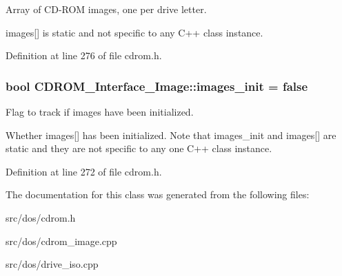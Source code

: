 Array of C\-D-\/\-R\-O\-M images, one per drive letter. 

images\mbox{[}\mbox{]} is static and not specific to any C++ class instance. 

Definition at line 276 of file cdrom.\-h.

\hypertarget{classCDROM__Interface__Image_a901be8d60520cf91bcabeb67a808c644}{
\subsubsection[{images\-\_\-init}]{\setlength{\rightskip}{0pt plus 5cm}bool {\bf C\-D\-R\-O\-M\-\_\-\-Interface\-\_\-\-Image\-::images\-\_\-init} = false}}\label{classCDROM__Interface__Image_a901be8d60520cf91bcabeb67a808c644}


Flag to track if images have been initialized. 

Whether images\mbox{[}\mbox{]} has been initialized. Note that images\-\_\-init and images\mbox{[}\mbox{]} are static and they are not specific to any one C++ class instance. 

Definition at line 272 of file cdrom.\-h.



The documentation for this class was generated from the following files\-:\begin{DoxyCompactItemize}
\item 
src/dos/cdrom.\-h\item 
src/dos/cdrom\-\_\-image.\-cpp\item 
src/dos/drive\-\_\-iso.\-cpp\end{DoxyCompactItemize}
